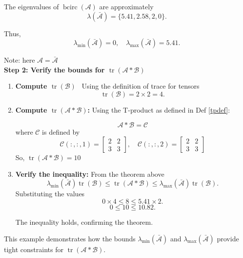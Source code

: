\documentclass[oupthm]{CUP-JNL-BCM}%
\theoremstyle{oupplain}
\theoremstyle{oupdefinition}
\theoremstyle{oupremark}
\theoremstyle{oupproof}
\numberwithin{equation}{section}
\begin{document}
\noindent The eigenvalues of \(\operatorname{bcirc}(\mathcal{A})\) are approximately
\[
\lambda(\bar{\mathcal{A}}) = \{5.41, 2.58, 2, 0\}.
\]

\noindent Thus,
\[
\lambda_{\min}(\bar{\mathcal{A}}) = 0, \quad \lambda_{\max}(\bar{\mathcal{A}}) = 5.41.
\]

\noindent Note: here $\mathcal{A} = \bar{\mathcal{A}}$\\

\noindent \textbf{Step 2: Verify the bounds for \(\operatorname{tr}(\mathcal{A} * \mathcal{B})\)}

\begin{enumerate}
    \item \textbf{Compute \(\operatorname{tr}(\mathcal{B})\)}~ Using the definition of trace for tensors
    \[
    \operatorname{tr}(\mathcal{B}) = 2\times 2 =4.
    \]
    

    \item \textbf{Compute \(\operatorname{tr}(\mathcal{A} * \mathcal{B})\):}  Using the T-product as defined in Def \ref{tpdef}:

   
    \[
    \mathcal{A} * \mathcal{B} = \mathcal{C} 
\]
where $\mathcal{C}$ is defined by 
\[
\mathcal{C}(:, :, 1) = \begin{bmatrix} 2 & 2 \\ 3 & 3 \end{bmatrix}, \quad  
\mathcal{C}(:, :, 2) = \begin{bmatrix} 2 & 2 \\ 3 & 3 \end{bmatrix}
\] 
   So, \(\operatorname{tr}(\mathcal{A} * \mathcal{B}) = 10\)

    \item \textbf{Verify the inequality:} From the theorem above
    \[
    \lambda_{\min}(\bar{\mathcal{A}}) \operatorname{tr}(\mathcal{B}) \leq \operatorname{tr}(\mathcal{A} * \mathcal{B}) \leq \lambda_{\max}(\bar{\mathcal{A}}) \operatorname{tr}(\mathcal{B}).
    \]
    Substituting the values
    \[
    0 \times 4 \leq 8 \leq 5.41 \times 2.
    \]
    \[
    0 \leq 10 \leq 10.82.
    \]

    \noindent The inequality holds, confirming the theorem.
\end{enumerate}

\noindent This example demonstrates how the bounds \(\lambda_{\min}(\bar{\mathcal{A}})\) and \(\lambda_{\max}(\bar{\mathcal{A}})\) provide tight constraints for \(\operatorname{tr}(\mathcal{A} * \mathcal{B})\).
\end{document}
